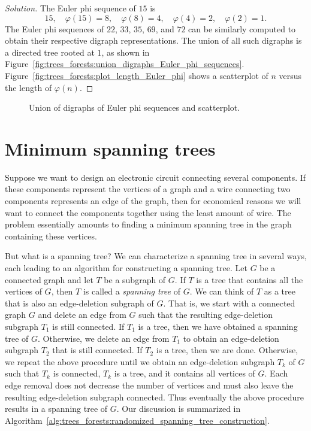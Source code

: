 \begin{proof}[Solution]
The Euler phi sequence of $15$ is
\[
15,\quad
\varphi(15) = 8,\quad
\varphi(8) = 4,\quad
\varphi(4) = 2,\quad
\varphi(2) = 1.
\]
The Euler phi sequences of $22$, $33$, $35$, $69$, and $72$ can be
similarly computed to obtain their respective digraph
representations. The union of all such digraphs is a directed tree
rooted at $1$, as shown in
Figure~\ref{fig:trees_forests:union_digraphs_Euler_phi_sequences}.
Figure~\ref{fig:trees_forests:plot_length_Euler_phi} shows a
scatterplot of $n$ versus the length of $\varphi(n)$.
\end{proof}

\begin{figure}[!htbp]
\centering
\subfigure[]{
\label{fig:trees_forests:union_digraphs_Euler_phi_sequences}

}
\quad
\subfigure[]{
\label{fig:trees_forests:plot_length_Euler_phi}

}
\caption{Union of digraphs of Euler phi sequences and scatterplot.}
\label{fig:trees_forests:union_digraphs_scatterplot}
\end{figure}



\section{Minimum spanning trees}

Suppose we want to design an electronic circuit connecting several
components. If these components represent the vertices of a graph and
a wire connecting two components represents an edge of the graph, then
for economical reasons we will want to connect the components together
using the least amount of wire. The problem essentially amounts to
finding a minimum spanning tree in the graph containing these vertices.

But what is a spanning tree? We can characterize a spanning tree in
several ways, each leading to an algorithm for constructing a spanning
tree. Let $G$ be a connected graph and let $T$ be a subgraph of
$G$. If $T$ is a tree that contains all the vertices of $G$, then $T$
is called a \emph{spanning tree} of $G$. We can think of $T$ as a tree
that is also an edge-deletion subgraph of $G$. That is, we start with
a connected graph $G$ and delete an edge from $G$ such that the
resulting edge-deletion subgraph $T_1$ is still connected. If $T_1$ is
a tree, then we have obtained a spanning tree of $G$. Otherwise, we
delete an edge from $T_1$ to obtain an edge-deletion subgraph $T_2$
that is still connected. If $T_2$ is a tree, then we are
done. Otherwise, we repeat the above procedure until we obtain an
edge-deletion subgraph $T_k$ of $G$ such that $T_k$ is connected,
$T_k$ is a tree, and it contains all vertices of $G$. Each edge
removal does not decrease the number of vertices and must also leave
the resulting edge-deletion subgraph connected. Thus eventually the
above procedure results in a spanning tree of $G$. Our discussion is
summarized in
Algorithm~\ref{alg:trees_forests:randomized_spanning_tree_construction}.

